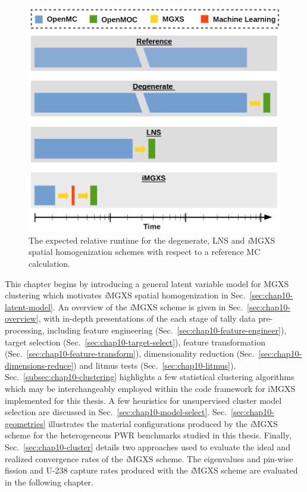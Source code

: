 \begin{figure}[h!]
\centering
\includegraphics[width=0.6\linewidth]{figures/unsupervised/flow-chart}
\vspace{2mm}
\caption[Expected relative runtime for different homogenization schemes]{The expected relative runtime for the degenerate, \ac{LNS} and \textit{i}\ac{MGXS} spatial homogenization schemes with respect to a reference \ac{MC} calculation.}
\label{fig:chap10-flow-chart}
\end{figure}

This chapter begins by introducing a general latent variable model for \ac{MGXS} clustering which motivates \textit{i}\ac{MGXS} spatial homogenization in Sec.~\ref{sec:chap10-latent-model}. An overview of the \textit{i}\ac{MGXS} scheme is given in Sec.~\ref{sec:chap10-overview}, with in-depth presentations of the each stage of tally data pre-processing, including feature engineering (Sec.~\ref{sec:chap10-feature-engineer}), target selection (Sec.~\ref{sec:chap10-target-select}), feature transformation (Sec.~\ref{sec:chap10-feature-transform}), dimensionality reduction (Sec.~\ref{sec:chap10-dimensions-reduce}) and litmus tests (Sec.~\ref{sec:chap10-litmus}). Sec.~\ref{subsec:chap10-clustering} highlights a few statistical clustering algorithms which may be interchangeably employed within the code framework for i\ac{MGXS} implemented for this thesis. A few heuristics for unsupervised cluster model selection are discussed in Sec.~\ref{sec:chap10-model-select}. Sec.~\ref{sec:chap10-geometries} illustrates the material configurations produced by the \textit{i}\ac{MGXS} scheme for the heterogeneous \ac{PWR} benchmarks studied in this thesis. Finally, Sec.~\ref{sec:chap10-cluster} details two approaches used to evaluate the ideal and realized convergence rates of the \textit{i}\ac{MGXS} scheme. The eigenvalues and pin-wise fission and U-238 capture rates produced with the \textit{i}\ac{MGXS} scheme are evaluated in the following chapter.
  


